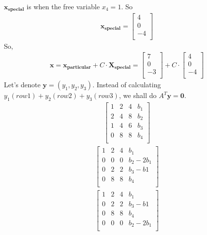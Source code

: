 \documentclass[a4paper,11pt]{article}
\newcommand{\mybf}[1]{\boldsymbol{#1}}
\begin{document}
$\mybf{x_{special}}$ is when the free variable $x_4=1$. So
\begin{align}
\mybf{x_{special}} = 
\begin{bmatrix}
4 \\
0 \\
-4 \\
\end{bmatrix} 
\end{align}
So,
\begin{align}
\mybf{x} = \mybf{x_{particular}} + C \cdot \mybf{X_{special}} = 
\begin{bmatrix}
7 \\
0 \\
-3 \\
\end{bmatrix}
+ C \cdot 
\begin{bmatrix}
4 \\
0 \\
-4 \\
\end{bmatrix}
\end{align}
Let's denote $\mybf{y}=(y_1, y_2, y_3)$. Instead of calculating $y_1 (row 1) + y_2 (row 2) + y_3 (row 3)$, we shall do $A^T\mybf{y}=\mybf{0}$. 
\begin{align}
\left[
\begin{array}{ccc|c}
1 & 2 & 4 & b_1 \\
2 & 4 & 8 & b_2\\
1 & 4 & 6 & b_3 \\
0 & 8 & 8 & b_4 \\
\end{array}
\right]
\end{align}
\begin{align}
\left[
\begin{array}{ccc|c}
1 & 2 & 4 & b_1 \\
0 & 0 & 0 & b_2-2b_1\\
0 & 2 & 2 & b_3-b1 \\
0 & 8 & 8 & b_4 \\
\end{array}
\right]
\end{align}
\begin{align}
\left[
\begin{array}{ccc|c}
1 & 2 & 4 & b_1 \\
0 & 2 & 2 & b_3-b1 \\
0 & 8 & 8 & b_4 \\
0 & 0 & 0 & b_2-2b_1\\
\end{array}
\right]
\end{align}
\end{document}
